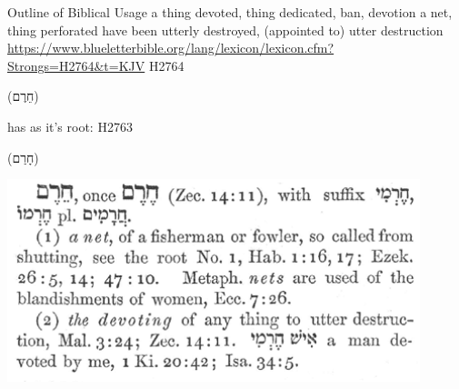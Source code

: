 \documentclass[11pt]{article}
\begin{document}
\begin{thebibliography}{37}
Outline of Biblical Usage\newline
a thing devoted, thing dedicated, ban, devotion
a net, thing perforated
have been utterly destroyed, (appointed to) utter destruction\newline
\url{https://www.blueletterbible.org/lang/lexicon/lexicon.cfm?Strongs=H2764&t=KJV}
\newline
H2764\begin{hebrew}(חֵרֶם)\end{hebrew} has as it's root: H2763\begin{hebrew}(חָרַם)\end{hebrew} \newline
\includegraphics[width=12cm]{H2764}

\end{thebibliography}
\end{document}
